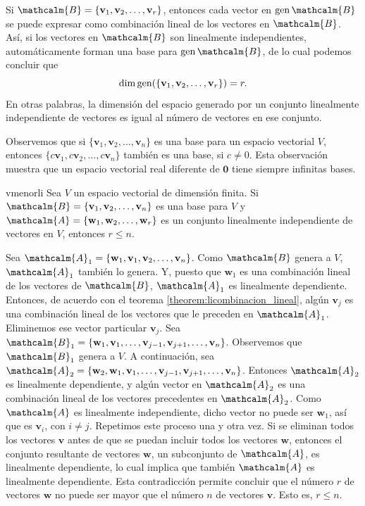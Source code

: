 \begin{examplebox}{}{}
    Si $\mathcalm{B} = \{\mathbf{v}_1, \mathbf{v}_2, \dots, \mathbf{v}_r\}$, entonces cada vector en $\Gen \mathcalm{B}$ se puede expresar como combinación lineal de los vectores en $\mathcalm{B}$. Así, si los vectores en $\mathcalm{B}$ son linealmente independientes, automáticamente forman una base para $\Gen \mathcalm{B}$, de lo cual podemos concluir que
    $$\operatorname{dim} \operatorname{gen}(\{\mathbf{v}_1, \mathbf{v}_2, \dots, \mathbf{v}_r\}) = r.$$
    En otras palabras, la dimensión del espacio generado por un conjunto linealmente independiente de vectores es igual al número de vectores en ese conjunto.
\end{examplebox}

\newpage

Observemos que si $\{ \mathbf{v}_1, \mathbf{v}_2, \dots, \mathbf{v}_n \}$ es una base para un espacio vectorial $V$, entonces $\{ c\mathbf{v}_1, c\mathbf{v}_2, \dots, c\mathbf{v}_n \}$ también es una base, si $c \neq 0$. Esta observación muestra que un espacio vectorial real diferente de $\mathbf{0}$ tiene siempre infinitas bases.

\begin{theorem}{}{vmenorli}
    Sea $V$ un espacio vectorial de dimensión finita. Si $\mathcalm{B} = \{\mathbf{v}_1, \mathbf{v}_2, \dots, \mathbf{v}_n\}$ es una base para $V$ y $\mathcalm{A} = \{\mathbf{w}_1, \mathbf{w}_2, \dots, \mathbf{w}_r\}$ es un conjunto linealmente independiente de vectores en $V$, entonces $r \leq n$.

    \tcblower
    \demostracion Sea $\mathcalm{A}_1 = \{\mathbf{w}_1, \mathbf{v}_1, \mathbf{v}_2, \dots, \mathbf{v}_n\}$. Como $\mathcalm{B}$ genera a $V$, $\mathcalm{A}_1$ también lo genera. Y, puesto que $\mathbf{w}_1$ es una combinación lineal de los vectores de $\mathcalm{B}$, $\mathcalm{A}_1$ es linealmente dependiente. Entonces, de acuerdo con el teorema \ref{theorem:licombinacion_lineal}, algún $\mathbf{v}_j$ es una combinación lineal de los vectores que le preceden en $\mathcalm{A}_1$. Eliminemos ese vector particular $\mathbf{v}_j$. Sea $\mathcalm{B}_1 = \{\mathbf{w}_1, \mathbf{v}_1, \dots, \mathbf{v}_{j-1}, \mathbf{v}_{j+1}, \dots, \mathbf{v}_n\}$. Observemos que $\mathcalm{B}_1$ genera a $V$. A continuación, sea $\mathcalm{A}_2 = \{\mathbf{w}_2, \mathbf{w}_1, \mathbf{v}_1, \dots, \mathbf{v}_{j-1}, \mathbf{v}_{j+1}, \dots, \mathbf{v}_n\}$. Entonces $\mathcalm{A}_2$ es linealmente dependiente, y algún vector en $\mathcalm{A}_2$ es una combinación lineal de los vectores precedentes en $\mathcalm{A}_2$. Como $\mathcalm{A}$ es linealmente independiente, dicho vector no puede ser $\mathbf{w}_1$, así que es $\mathbf{v}_i$, con $i \neq j$. Repetimos este proceso una y otra vez. Si se eliminan todos los vectores $\mathbf{v}$ antes de que se puedan incluir todos los vectores $\mathbf{w}$, entonces el conjunto resultante de vectores $\mathbf{w}$, un subconjunto de $\mathcalm{A}$, es linealmente dependiente, lo cual implica que también $\mathcalm{A}$ es linealmente dependiente. Esta contradicción permite concluir que el número $r$ de vectores $\mathbf{w}$ no puede ser mayor que el número $n$ de vectores $\mathbf{v}$. Esto es, $r \leq n$.
\end{theorem}

